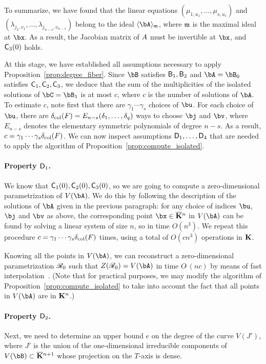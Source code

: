 \documentclass[12pt]{article}
\begin{document}
To summarize, we have found that the linear equations
$(\mu_{1,u_1},\dots,\mu_{s,u_s})$ and
$(\lambda_{j_1,v_1},\dots,\lambda_{j_{n-s},v_{n-s}})$ belong to the
ideal $\langle \bA \rangle_\m$, where $\mathfrak{m}$ is the maximal ideal at
$\bx$. As a result, the Jacobian matrix of ${A}$ must be invertible
at $\bx$, and $\mathsf{C}_3(0)$ holds.


\medskip

At this stage, we have established all assumptions necessary to apply
Proposition~\ref{prop:degree_fiber}. Since $\bB$ satisfies
$\mathsf{B}_1,\mathsf{B}_2$ and $\bA=\bB_0$ satisfies $\mathsf{C}_1,\mathsf{C}_2,\mathsf{C}_3$,
we deduce that the sum of the multiplicities of the isolated solutions
of $\bC=\bB_1$ is at most $c$, where $c$ is the number of solutions of
$\bA$. To estimate $c$, note first that there are $\gamma_1\cdots
\gamma_s$ choices of $\bu$. For each choice of $\bu$, there are
$\delta_{\rm col}({F})=E_{n-s}(\delta_1, \ldots, \delta_q)$ ways to
choose $\bj$ and $\bv$, where $E_{n-s}$ denotes the elementary
symmetric polynomials of degree $n-s$. As a result, $c=\gamma_1\cdots
\gamma_s \delta_{\rm col}({F})$. We can now inspect assumptions
$\mathsf{D}_1,\dots,\mathsf{D}_4$ that are needed to apply 
the algorithm of Proposition~\ref{prop:compute_isolated}.

\paragraph{Property $\mathsf{D}_1$.} We know that $\mathsf{C}_1(0),\mathsf{C}_2(0),\mathsf{C}_3(0)$,
so we are going to compute a zero-dimensional parametrization of
$V(\bA)$.  We do this by following the description of the solutions of
$\bA$ given in the previous paragraph: for any choice of indices
$\bu$, $\bj$ and $\bv$ as above, the corresponding point $\bx \in
\KKbar{}^n$ in $V(\bA)$ can be found by solving a linear system of
size $n$, so in time $O(n^3)$. We repeat this procedure
$c=\gamma_1\cdots \gamma_s \delta_{\rm col}({F})$ times, using a total
of $O(c n^3)$ operations in $\mathbf{K}$.

Knowing all the points in $V(\bA)$, we can reconstruct a zero-dimensional
parametrization $\mathscr{R}_0$ such that $Z(\scrR_0)=V(\bA)$ in time
$O\tilde{~}(n c)$ by means of fast interpolation~\cite[Chapter~10]{GaGe03}.
(Note that for practical purposes, we may modify the algorithm
of Proposition~\ref{prop:compute_isolated} to take into account the
fact that all points in $V(\bA)$ are in $\mathbf{K}^n$.)

\paragraph{Property $\mathsf{D}_2$.} Next, we need to determine an upper bound 
$e$ on the degree of the curve $V(J')$, where $J'$ is the union of the
one-dimensional irreducible components of $V(\bB) \subset
\KKbar{}^{n+1}$ whose projection on the $T$-axis is dense.
\end{document}
